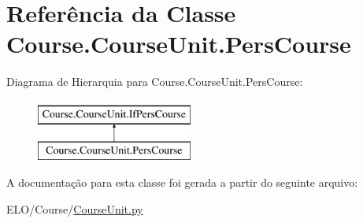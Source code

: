 \hypertarget{classCourse_1_1CourseUnit_1_1PersCourse}{\section{Referência da Classe Course.\-Course\-Unit.\-Pers\-Course}
\label{d1/d75/classCourse_1_1CourseUnit_1_1PersCourse}
}
Diagrama de Hierarquia para Course.\-Course\-Unit.\-Pers\-Course\-:\begin{figure}[H]
\begin{center}
\leavevmode
\includegraphics[height=2.000000cm]{d1/d75/classCourse_1_1CourseUnit_1_1PersCourse}
\end{center}
\end{figure}


A documentação para esta classe foi gerada a partir do seguinte arquivo\-:\begin{DoxyCompactItemize}
\item 
E\-L\-O/\-Course/\hyperlink{CourseUnit_8py}{Course\-Unit.\-py}\end{DoxyCompactItemize}
